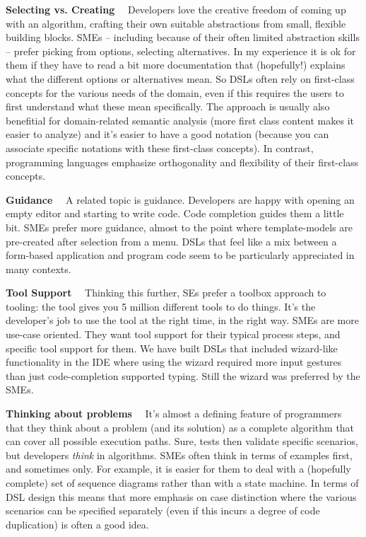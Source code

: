 \documentclass[runningheads]{llncs}
\newcommand\parhead[1]{\vspace{1mm}\noindent\textbf{{#1}}\ \ }
\begin{document}
\parhead{Selecting vs. Creating} Developers love the creative freedom of coming
up with an algorithm, crafting their own suitable abstractions from small,
flexible building blocks. SMEs -- including because of their often limited
abstraction skills -- prefer picking from options, selecting alternatives.
In my experience it is ok for them if they have to read a bit more documentation
that (hopefully!) explains what the different options or alternatives mean.
So DSLs often rely on first-class concepts for the various needs of the domain,
even if this requires the users to first understand what these mean
specifically. The approach is usually also benefitial for domain-related
semantic analysis (more first class content makes it easier to analyze) and it's
easier to have a good notation (because you can associate specific notations
with these first-class concepts). In contrast, programming languages emphasize
orthogonality and flexibility of their first-class concepts.

\parhead{Guidance} A related topic is guidance. Developers are happy with
opening an empty editor and starting to write code. Code completion guides
them a little bit. SMEs prefer more guidance, almost to the point where 
template-models are pre-created after selection from a menu. DSLs that feel
like a mix between a form-based application and program code seem to be 
particularly appreciated in many contexts.

\parhead{Tool Support} Thinking this further, SEs prefer a toolbox approach
to tooling: the tool gives you 5 million different tools to do things. It's
the developer's job to use the tool at the right time, in the right way.
SMEs are more use-case oriented. They want tool support for their typical
process steps, and specific tool support for them. We have built DSLs that
included wizard-like functionality in the IDE where using the wizard required
more input gestures than just code-completion supported typing. Still the
wizard was preferred by the SMEs.
 
\parhead{Thinking about problems} It's almost a defining feature of programmers
that they think about a problem (and its solution) as a complete algorithm
that can cover all possible execution paths. Sure, tests then validate 
specific scenarios, but developers \emph{think} in algorithms. SMEs often
think in terms of examples first, and sometimes only. For example, it is easier
for them to deal with a (hopefully complete) set of sequence diagrams rather
than with a state machine. In terms of DSL design this means that more
emphasis on case distinction where the various scenarios can be specified
separately (even if this incurs a degree of code duplication) is often 
a good idea.
\end{document}
